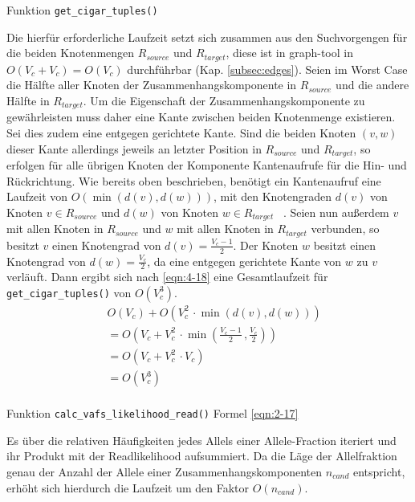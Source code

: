 Funktion \lstinline|get_cigar_tuples()|

Die hierfür erforderliche Laufzeit setzt sich zusammen aus den Suchvorgengen für die beiden Knotenmengen $ R_{source} $ und $ R_{target} $, diese ist in graph-tool in $O(V_{c} + V_{c}) = O(V_{c})$ durchführbar (Kap. \ref{subsec:edges}). Seien im Worst Case die Hälfte aller Knoten der Zusammenhangskomponente in $ R_{source} $ und die andere Hälfte in $ R_{target} $. Um die Eigenschaft der Zusammenhangskomponente zu gewährleisten muss daher eine Kante zwischen beiden Knotenmenge existieren. Sei dies zudem eine entgegen gerichtete Kante. Sind die beiden Knoten $ (v, w) $ dieser Kante allerdings jeweils an letzter Position in $ R_{source} $ und $ R_{target} $, so erfolgen für alle übrigen Knoten der Komponente Kantenaufrufe für die Hin- und Rückrichtung. Wie bereits oben beschrieben, benötigt ein Kantenaufruf eine Laufzeit von $ O(\min (d(v), d(w)))$, mit den Knotengraden $d(v) $ von Knoten $v \in R_{source}$ und $ d(w) $ von Knoten $ w \in R_{target} $ ~\cite{docs_graph_tool}. Seien nun außerdem $ v $ mit allen Knoten in $ R_{source} $ und $ w $ mit allen Knoten in $ R_{target} $ verbunden, so besitzt $v$ einen Knotengrad von $ d(v) = \frac{V_{c}-1}{2} $. Der Knoten $ w $ besitzt einen Knotengrad von $ d(w) = \frac{V_{c}}{2} $, da eine entgegen gerichtete Kante von $w$ zu $v$ verläuft. Dann ergibt sich nach \eqref{eqn:4-18} eine Gesamtlaufzeit für \lstinline|get_cigar_tuples()| von $ O(V_{c}^3) $. \\

\begin{equation} \label{eqn:4-18}
\tag{4-18}
\begin{aligned}
&\ {} O(V_{c}) + O(V_{c}^2 \, \cdotp \min (d(v), d(w)))  \\
& \ = O\left( V_{c} + V_{c}^2 \, \cdotp \min \left( \frac{V_{c}-1}{2}\,, \frac{V_{c}}{2}\right) \right) \\
&\ = O(V_{c} + V_{c}^2 \, \cdotp V_{c}) \\
&\ = O(V_{c}^3) \\
\end{aligned}
\end{equation}

Funktion \lstinline|calc_vafs_likelihood_read()| Formel \eqref{eqn:2-17} 

Es über die relativen Häufigkeiten jedes Allels einer Allele-Fraction iteriert und ihr Produkt mit der Readlikelihood aufsummiert. Da die Läge der Allelfraktion genau der Anzahl der Allele einer Zusammenhangskomponenten $ n_{cand} $ entspricht, erhöht sich hierdurch die Laufzeit um den Faktor $ O(n_{cand}) $.

